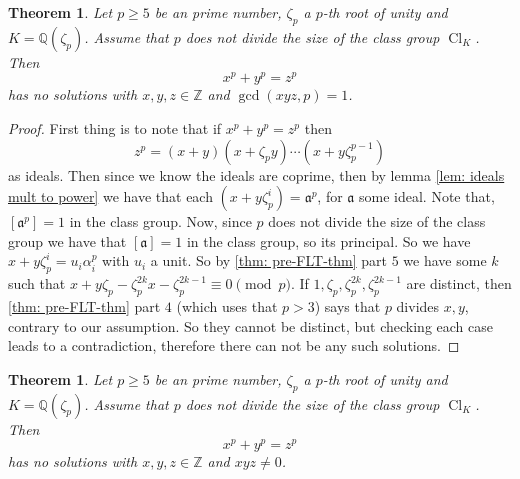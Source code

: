 \documentclass[11pt,a4paper]{amsart}
\theoremstyle{plain}
\newtheorem{thm}[subsection]{Theorem}
\theoremstyle{definition}
\theoremstyle{definition}
\newcommand{\ZZ}{\mathbb{Z}}
\def\QQ{\mathbb{Q}}
\def \a{\alpha}
\def\gotha{\mathfrak{a}}
\DeclareMathOperator{\Cl}{Cl}
\begin{document}
	\begin{thm}\label{thm:FLT case one}
		Let $p \geq 5$ be an prime number, $\zeta_p$ a $p$-th root of unity and $K=\QQ(\zeta_p)$. Assume  that $p$ does not divide the size of  the class group $\Cl_K$. Then \[x^p+y^p=z^p\] has no solutions with $x,y,z \in \ZZ$ and $\gcd(xyz,p)=1$. 
	\end{thm}
	\begin{proof}
		First thing is to note that if $x^p+y^p=z^p$ then \[z^p=(x+y)(x+\zeta_py)\cdots(x+y\zeta_p^{p-1})\] as ideals. Then since we know the ideals are coprime, then by lemma \ref{lem: ideals mult to power} we have that each $(x+y\zeta_p^i)=\gotha^p$, for $\gotha$ some ideal. Note that, $[\gotha^p]=1$ in the class group. Now, since $p$ does not divide the size of the class group we have that $[\gotha]=1$ in the class group, so its principal. So we have $x+y\zeta_p^i=u_i\a_i^p$ with $u_i$ a unit. So by \ref{thm: pre-FLT-thm} part $5$ we have some $k$ such that $x+y\zeta_p-\zeta_p^{2k}x-\zeta_p^{2k-1} \equiv 0 \pmod p$. If $1,\zeta_p,\zeta_p^{2k},\zeta_p^{2k-1}$ are distinct, then \ref{thm: pre-FLT-thm} part $4$ (which uses that $p>3$) says that $p$  divides $x,y$, contrary to our assumption. So they cannot be distinct, but checking each case leads to a contradiction, therefore there can not be any such solutions.
	\end{proof}
	
	
	\begin{thm}\label{FLT regular case}
		Let $p \geq 5$ be an prime number, $\zeta_p$ a $p$-th root of unity and $K=\QQ(\zeta_p)$. Assume  that $p$ does not divide the size of  the class group $\Cl_K$. Then \[x^p+y^p=z^p\] has no solutions with $x,y,z \in \ZZ$ and $xyz \ne 0$. 
	\end{thm}
	
	
	
	
	
\end{document}
